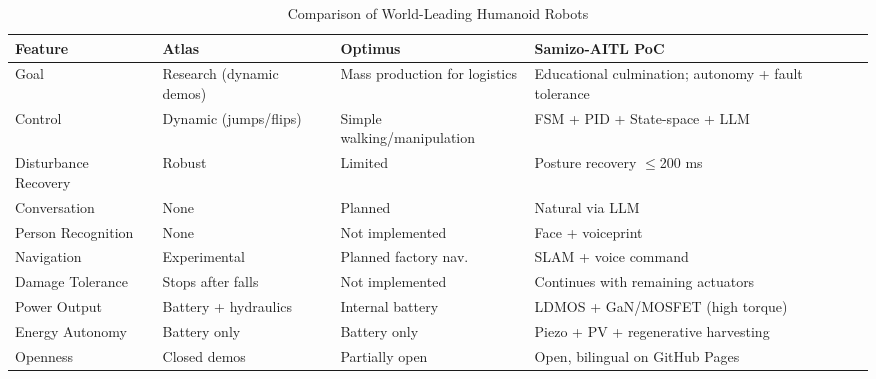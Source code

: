 \begin{table*}[t]
\caption{Comparison of World-Leading Humanoid Robots}
\label{tab:humanoid_comparison}
\centering
\renewcommand{\arraystretch}{1.2}
\footnotesize
\begin{tabular}{p{2.5cm} p{2.5cm} p{2.5cm} p{6.5cm}}
\toprule
\textbf{Feature} & \textbf{Atlas} & \textbf{Optimus} & \textbf{Samizo-AITL PoC} \\
\midrule
Goal & Research (dynamic demos) & Mass production for logistics & Educational culmination; autonomy + fault tolerance \\
Control & Dynamic (jumps/flips) & Simple walking/manipulation & FSM + PID + State-space + LLM \\
Disturbance Recovery & Robust & Limited & Posture recovery $\leq$200 ms \\
Conversation & None & Planned & Natural via LLM \\
Person Recognition & None & Not implemented & Face + voiceprint \\
Navigation & Experimental & Planned factory nav. & SLAM + voice command \\
Damage Tolerance & Stops after falls & Not implemented & Continues with remaining actuators \\
Power Output & Battery + hydraulics & Internal battery & LDMOS + GaN/MOSFET (high torque) \\
Energy Autonomy & Battery only & Battery only & Piezo + PV + regenerative harvesting \\
Openness & Closed demos & Partially open & Open, bilingual on GitHub Pages \\
\bottomrule
\end{tabular}
\end{table*}
